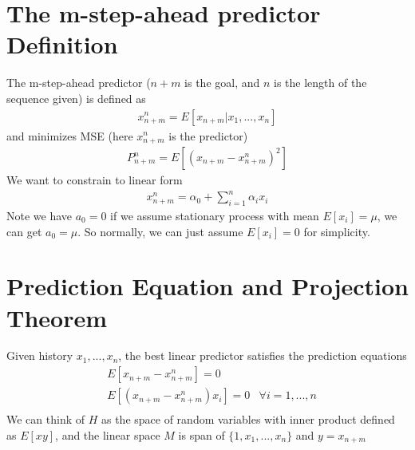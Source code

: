 \section{The m-step-ahead predictor Definition}
The m-step-ahead predictor ($n+m$ is the goal, and $n$ is the length of the sequence given) is defined as 
    \begin{align*}
        x^n_{n+m} = E[x_{n+m}|x_1,...,x_n]
    \end{align*}
and minimizes MSE (here $x^n_{n+m}$ is the predictor)
    \begin{align*}
        P^n_{n+m} = E[(x_{n+m} - x^n_{n+m})^2]
    \end{align*}
We want to constrain to linear form 
    \begin{align*}
        x^n_{n+m} = \alpha_0 + \sum_{i=1}^{n} \alpha_i x_i 
    \end{align*}
Note we have $a_0 = 0$ if we assume stationary process with mean $E[x_i] = \mu$, we can get $a_0 = \mu$. So normally, we can just assume $E[x_i] =0$ for simplicity. 


\section{Prediction Equation and Projection Theorem} 
Given history $x_1,...,x_n$, the best linear predictor satisfies the prediction equations 
    \begin{align*}
        & E[x_{n+m} - x^n_{n+m}] = 0  \tag{Unbiased predictor} \\
        & E[(x_{n+m} - x_{n+m}^n)x_i] = 0 & \forall i = 1,...,n \tag{Error uncorrelated to observed value (projection theorem)} \\
    \end{align*}
We can think of $H$ as the space of random variables with inner product defined as $E[xy]$, and the linear space $M$ is span of $\{1, x_1, ..., x_n\}$ and $y = x_{n+m}$


